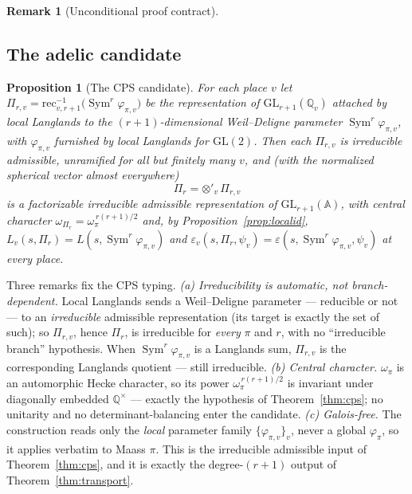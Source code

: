 \documentclass[11pt]{article}
\newtheorem{proposition}[theorem]{Proposition}
\theoremstyle{definition}
\newtheorem{remark}[theorem]{Remark}
\newcommand{\Sym}{\operatorname{Sym}}
\begin{document}
\begin{remark}[Unconditional proof contract]
\begin{enumerate}
\section{The adelic candidate}\label{sec:cps-cand}
\begin{proposition}[The CPS candidate]\label{prop:cps-cand}
For each place $v$ let $\Pi_{r,v}=\mathrm{rec}_{v,r+1}^{-1}\bigl(\Sym^r\varphi_{\pi,v}\bigr)$ be the
representation of $\mathrm{GL}_{r+1}(\mathbb Q_v)$ attached by local Langlands to the $(r+1)$-dimensional
Weil--Deligne parameter $\Sym^r\varphi_{\pi,v}$, with $\varphi_{\pi,v}$ furnished by local Langlands for
$\mathrm{GL}(2)$. Then each $\Pi_{r,v}$ is \emph{irreducible admissible}, unramified for all but finitely many
$v$, and (with the normalized spherical vector almost everywhere)
\[
  \Pi_r=\otimes'_v\,\Pi_{r,v}
\]
is a factorizable \emph{irreducible admissible} representation of $\mathrm{GL}_{r+1}(\mathbb A)$, with central
character $\omega_{\Pi_r}=\omega_\pi^{\,r(r+1)/2}$ and, by Proposition~\ref{prop:localid},
$L_v(s,\Pi_r)=L(s,\Sym^r\varphi_{\pi,v})$ and
$\varepsilon_v(s,\Pi_r,\psi_v)=\varepsilon(s,\Sym^r\varphi_{\pi,v},\psi_v)$ at every place.
\end{proposition}
\noindent Three remarks fix the CPS typing. \emph{(a) Irreducibility is automatic, not branch-dependent.}
Local Langlands sends a Weil--Deligne parameter --- reducible or not --- to an \emph{irreducible} admissible
representation (its target is exactly the set of such); so $\Pi_{r,v}$, hence $\Pi_r$, is irreducible for
\emph{every} $\pi$ and $r$, with no ``irreducible branch'' hypothesis. When $\Sym^r\varphi_{\pi,v}$ is a
Langlands sum, $\Pi_{r,v}$ is the corresponding Langlands quotient --- still irreducible. \emph{(b) Central
character.} $\omega_\pi$ is an automorphic Hecke character, so its power $\omega_\pi^{\,r(r+1)/2}$ is invariant
under diagonally embedded $\mathbb Q^\times$ --- exactly the hypothesis of Theorem~\ref{thm:cps}; no unitarity
and no determinant-balancing enter the candidate. \emph{(c) Galois-free.} The construction reads only the
\emph{local} parameter family $\{\varphi_{\pi,v}\}_v$, never a global $\varphi_\pi$, so it applies verbatim to
Maass $\pi$. This is the irreducible admissible input of Theorem~\ref{thm:cps}, and it is exactly the
degree-$(r+1)$ output of Theorem~\ref{thm:transport}.


\end{enumerate}
\end{remark}
\end{document}
